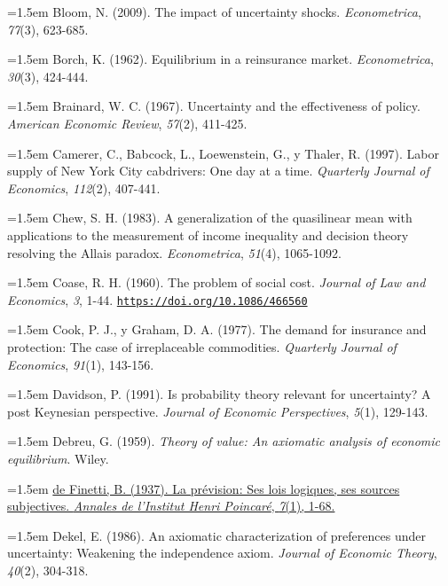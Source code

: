 \documentclass[10pt,a4paper]{article}
\begin{document}
\noindent\hangindent=1.5em Bloom, N. (2009). The impact of uncertainty shocks. \textit{Econometrica}, \textit{77}(3), 623-685.

\noindent\hangindent=1.5em Borch, K. (1962). Equilibrium in a reinsurance market. \textit{Econometrica}, \textit{30}(3), 424-444.

\noindent\hangindent=1.5em Brainard, W. C. (1967). Uncertainty and the effectiveness of policy. \textit{American Economic Review}, \textit{57}(2), 411-425.

\noindent\hangindent=1.5em Camerer, C., Babcock, L., Loewenstein, G., y Thaler, R. (1997). Labor supply of New York City cabdrivers: One day at a time. \textit{Quarterly Journal of Economics}, \textit{112}(2), 407-441.

\noindent\hangindent=1.5em Chew, S. H. (1983). A generalization of the quasilinear mean with applications to the measurement of income inequality and decision theory resolving the Allais paradox. \textit{Econometrica}, \textit{51}(4), 1065-1092.

\noindent\hangindent=1.5em Coase, R. H. (1960). The problem of social cost. \textit{Journal of Law and Economics}, \textit{3}, 1-44. \href{https://doi.org/10.1086/466560}{\nolinkurl{https://doi.org/10.1086/466560}}

\noindent\hangindent=1.5em Cook, P. J., y Graham, D. A. (1977). The demand for insurance and protection: The case of irreplaceable commodities. \textit{Quarterly Journal of Economics}, \textit{91}(1), 143-156.

\noindent\hangindent=1.5em Davidson, P. (1991). Is probability theory relevant for uncertainty? A post Keynesian perspective. \textit{Journal of Economic Perspectives}, \textit{5}(1), 129-143.

\noindent\hangindent=1.5em Debreu, G. (1959). \textit{Theory of value: An axiomatic analysis of economic equilibrium}. Wiley.

\noindent\hangindent=1.5em \href{https://www.numdam.org/item/AIHP_1937__7_1_1_0/}{de Finetti, B. (1937). La prévision: Ses lois logiques, ses sources subjectives. \textit{Annales de l'Institut Henri Poincaré}, \textit{7}(1), 1-68.}

\noindent\hangindent=1.5em Dekel, E. (1986). An axiomatic characterization of preferences under uncertainty: Weakening the independence axiom. \textit{Journal of Economic Theory}, \textit{40}(2), 304-318.
\end{document}
